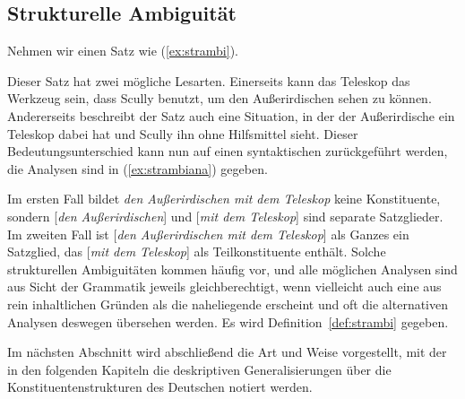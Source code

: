\subsection{Strukturelle Ambiguität}

Nehmen wir einen Satz wie (\ref{ex:strambi}).

\begin{exe}
\end{exe}

Dieser Satz hat zwei mögliche Lesarten.
Einerseits kann das Teleskop das Werkzeug sein, dass Scully benutzt, um den Außerirdischen sehen zu können.
Andererseits beschreibt der Satz auch eine Situation, in der der Außerirdische ein Teleskop dabei hat und Scully ihn ohne Hilfsmittel sieht.
Dieser Bedeutungsunterschied kann nun auf einen syntaktischen zurückgeführt werden, die Analysen sind in (\ref{ex:strambiana}) gegeben.

\begin{exe}
  \ex\label{ex:strambiana}
  \begin{xlist}
  \end{xlist}
\end{exe}

Im ersten Fall bildet \textit{den Außerirdischen mit dem Teleskop} keine Konstituente, sondern [\textit{den Außerirdischen}] und [\textit{mit dem Teleskop}] sind separate Satzglieder.
Im zweiten Fall ist [\textit{den Außerirdischen mit dem Teleskop}] als Ganzes ein Satzglied, das [\textit{mit dem Teleskop}] als Teilkonstituente enthält.
Solche strukturellen Ambiguitäten kommen häufig vor, und alle möglichen Analysen sind aus Sicht der Grammatik jeweils gleichberechtigt, wenn vielleicht auch eine aus rein inhaltlichen Gründen als die naheliegende erscheint und oft die alternativen Analysen deswegen übersehen werden.
Es wird Definition~\ref{def:strambi} gegeben.


Im nächsten Abschnitt wird abschließend die Art und Weise vorgestellt, mit der in den folgenden Kapiteln die deskriptiven Generalisierungen über die Konstituentenstrukturen des Deutschen notiert werden.



